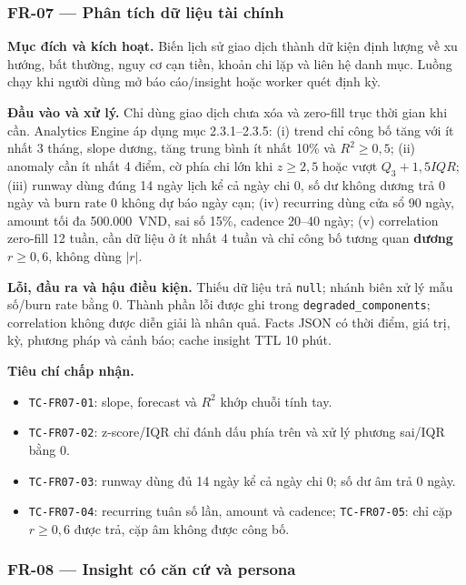 \subsubsection{FR-07 --- Phân tích dữ liệu tài chính}

\textbf{Mục đích và kích hoạt.} Biến lịch sử giao dịch thành dữ kiện định lượng về xu hướng, bất thường, nguy cơ cạn tiền, khoản chi lặp và liên hệ danh mục. Luồng chạy khi người dùng mở báo cáo/insight hoặc worker quét định kỳ.

\textbf{Đầu vào và xử lý.} Chỉ dùng giao dịch chưa xóa và zero-fill trục thời gian khi cần. Analytics Engine áp dụng mục 2.3.1--2.3.5: (i) trend chỉ công bố tăng với ít nhất 3 tháng, slope dương, tăng trung bình ít nhất 10\% và $R^2\geq0{,}5$; (ii) anomaly cần ít nhất 4 điểm, cờ phía chi lớn khi $z\geq2{,}5$ hoặc vượt $Q_3+1{,}5IQR$; (iii) runway dùng đúng 14 ngày lịch kể cả ngày chi 0, số dư không dương trả 0 ngày và burn rate 0 không dự báo ngày cạn; (iv) recurring dùng cửa sổ 90 ngày, amount tối đa 500.000~VND, sai số 15\%, cadence 20--40 ngày; (v) correlation zero-fill 12 tuần, cần dữ liệu ở ít nhất 4 tuần và chỉ công bố tương quan \textbf{dương} $r\geq0{,}6$, không dùng $|r|$.

\textbf{Lỗi, đầu ra và hậu điều kiện.} Thiếu dữ liệu trả \texttt{null}; nhánh biên xử lý mẫu số/burn rate bằng 0. Thành phần lỗi được ghi trong \texttt{degraded\_components}; correlation không được diễn giải là nhân quả. Facts JSON có thời điểm, giá trị, kỳ, phương pháp và cảnh báo; cache insight TTL 10 phút.

\textbf{Tiêu chí chấp nhận.}
\begin{itemize}
  \item \texttt{TC-FR07-01}: slope, forecast và $R^2$ khớp chuỗi tính tay.
  \item \texttt{TC-FR07-02}: z-score/IQR chỉ đánh dấu phía trên và xử lý phương sai/IQR bằng 0.
  \item \texttt{TC-FR07-03}: runway dùng đủ 14 ngày kể cả ngày chi 0; số dư âm trả 0 ngày.
  \item \texttt{TC-FR07-04}: recurring tuân số lần, amount và cadence; \texttt{TC-FR07-05}: chỉ cặp $r\geq0{,}6$ được trả, cặp âm không được công bố.
\end{itemize}

\subsubsection{FR-08 --- Insight có căn cứ và persona}

